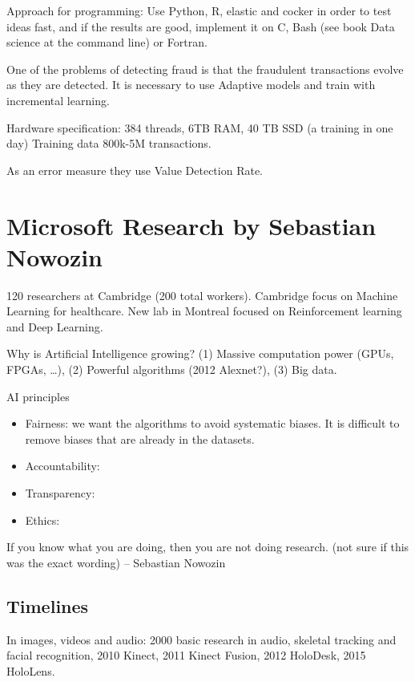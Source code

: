 \documentclass[b5paper]{report}
\begin{document}
Approach for programming: Use Python, R, elastic and cocker in order to test
ideas fast, and if the results are good, implement it on C, Bash (see book Data
science at the command line) or Fortran.

One of the problems of detecting fraud is that the fraudulent transactions
evolve as they are detected. It is necessary to use Adaptive models and train
with incremental learning.

Hardware specification: 384 threads, 6TB RAM, 40 TB SSD (a training in one day)
Training data 800k-5M transactions.

As an error measure they use Value Detection Rate.

\section{Microsoft Research by Sebastian Nowozin}

120 researchers at Cambridge (200 total workers). Cambridge focus on Machine
Learning for healthcare. New lab in Montreal focused on Reinforcement learning
and Deep Learning.

Why is Artificial Intelligence growing? (1) Massive computation power (GPUs,
FPGAs, \dots), (2) Powerful algorithms (2012 Alexnet?), (3) Big data.

AI principles

\begin{itemize}
  \item Fairness: we want the algorithms to avoid systematic biases. It is
    difficult to remove biases that are already in the datasets.
  \item Accountability:
  \item Transparency:
  \item Ethics:
\end{itemize}

\begin{mybox}
  If you know what you are doing, then you are not doing research. (not sure if
  this was the exact wording) -- Sebastian Nowozin
\end{mybox}

\subsection{Timelines}

In images, videos and audio: 2000 basic research in audio, skeletal tracking
and facial recognition, 2010 Kinect, 2011 Kinect Fusion, 2012 HoloDesk, 2015
HoloLens.
\end{document}
